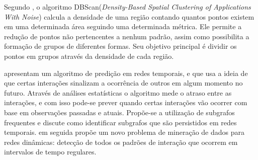 Segundo \cite{density-based-clusters}, o algoritmo DBScan(\textit{Density-Based Spatial Clustering
of Applications With Noise}) calcula a densidade de uma região contando quantos pontos existem
em uma determinada área seguindo uma determinada métrica. Ele permite a redução de pontos não
pertencentes a nenhum padrão, assim como possibilita a formação de grupos de diferentes formas.
Seu objetivo principal é dividir os pontos em grupos através da densidade de cada região.

\cite{lahiri2007} apresentam um algoritmo de predição em redes temporais, e que usa a ideia de que certas
interações sinalizam a ocorrência de outros em algum momento no futuro. Através de análises estatísticas
o algoritmo mede o atraso entre as interações, e com isso pode-se prever quando certas interações vão ocorrer
com base em observações passadas e atuais. Propõe-se a utilização de subgrafos frequentes e discute
como identificar subgrafos que são persistidos em redes temporais.
\cite{lahiri2008} em seguida propõe um novo problema de mineração de dados para redes dinâmicas:
detecção de todos os padrões de interação que ocorrem em intervalos de tempo regulares.











